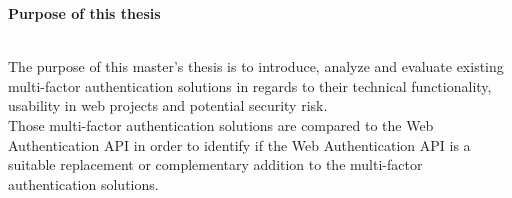 \thispagestyle{empty}

\begin{large}
	\textbf{Purpose of this thesis} \\ \\
\end{large}
The purpose of this master's thesis is to introduce, analyze and evaluate existing multi-factor authentication solutions in regards to their technical functionality, usability in web projects and potential security risk.\\
Those multi-factor authentication solutions are compared to the Web Authentication API in order to identify if the Web Authentication API is a suitable replacement or complementary addition to the multi-factor authentication solutions.
\newpage

